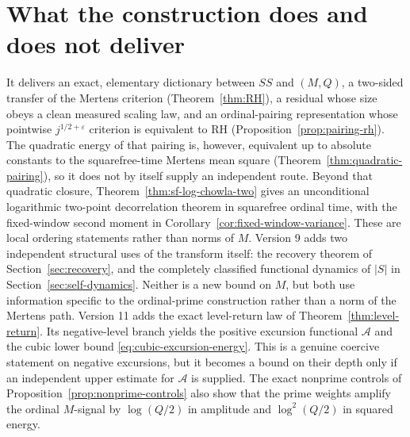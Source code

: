 \documentclass[11pt]{amsart}
\numberwithin{equation}{section}
\theoremstyle{plain}
\theoremstyle{definition}
\theoremstyle{remark}
\newcommand{\Mert}{M}
\newcommand{\Sq}{Q}
\begin{document}
\section{What the construction does and does not deliver}
\label{sec:deliverables}

It delivers an exact, elementary dictionary between $SS$ and $(\Mert,\Sq)$, a
two-sided transfer of the Mertens criterion (Theorem~\ref{thm:RH}), a
residual whose size obeys a clean measured scaling law, and an ordinal-pairing
representation whose pointwise $j^{1/2+\varepsilon}$ criterion is equivalent to RH
(Proposition~\ref{prop:pairing-rh}).  The quadratic energy of that pairing is,
however, equivalent up to absolute constants to the squarefree-time Mertens
mean square (Theorem~\ref{thm:quadratic-pairing}), so it does not by itself
supply an independent route.  Beyond that quadratic closure,
Theorem~\ref{thm:sf-log-chowla-two} gives an unconditional logarithmic
two-point decorrelation theorem in squarefree ordinal time, with the fixed-window
second moment in Corollary~\ref{cor:fixed-window-variance}.  These are local
ordering statements rather than norms of $M$.  Version 9 adds two independent
structural uses of the transform itself: the recovery theorem of
Section~\ref{sec:recovery}, and the completely classified functional dynamics
of $|S|$ in Section~\ref{sec:self-dynamics}.  Neither is a new bound on $M$,
but both use information specific to the ordinal-prime construction rather than
a norm of the Mertens path.
Version 11 adds the exact level-return law of Theorem~\ref{thm:level-return}.
Its negative-level branch yields the positive excursion functional
$\mathcal A$ and the cubic lower bound
\eqref{eq:cubic-excursion-energy}.  This is a genuine coercive statement on
negative excursions, but it becomes a bound on their depth only if an
independent upper estimate for $\mathcal A$ is supplied.  The exact nonprime
controls of Proposition~\ref{prop:nonprime-controls} also show that the prime
weights amplify the ordinal $M$-signal by $\log(Q/2)$ in amplitude and
$\log^2(Q/2)$ in squared energy.
\end{document}
